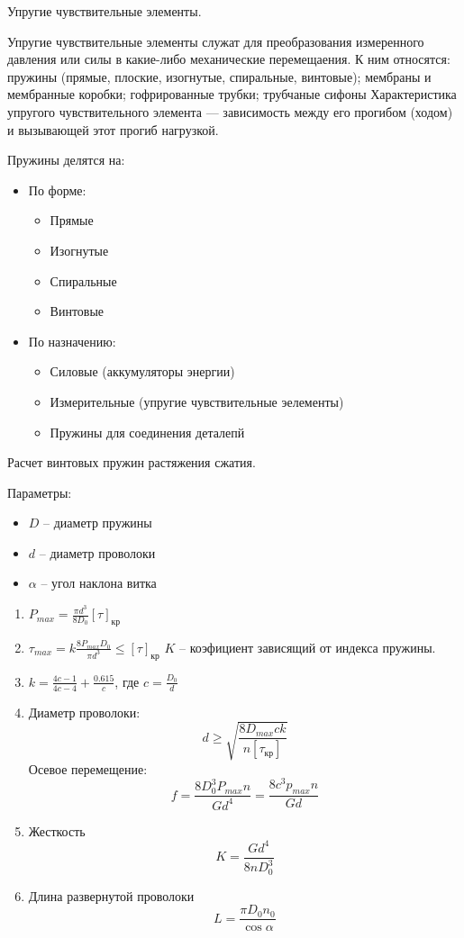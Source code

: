\documentclass{article}
\begin{document}
Упругие чувствительные элементы.

Упругие чувствительные элементы служат для преобразования измеренного давления или силы в какие-либо механические перемещаения. К ним относятся: пружины (прямые, плоские, изогнутые, спиральные, винтовые); мембраны и мембранные коробки; гофрированные трубки; трубчаные сифоны
Характеристика упругого чувствительного элемента --- зависимость между его прогибом (ходом) и вызывающей этот прогиб нагрузкой.

Пружины делятся на:
\begin{itemize}
	\item По форме:
	\begin{itemize}
		\item Прямые
		\item Изогнутые
		\item Спиральные
		\item Винтовые
	\end{itemize}
	\item По назначению:
	\begin{itemize}
		\item Силовые (аккумуляторы энергии)
		\item Измерительные (упругие чувствительные эелементы)
		\item Пружины для соединения деталепй
	\end{itemize}
\end{itemize}

Расчет винтовых пружин растяжения сжатия.

Параметры:
\begin{itemize}
	\item $D$ -- диаметр пружины
	\item $d$ -- диаметр проволоки
	\item $ \alpha$ -- угол наклона витка
\end{itemize}

\begin{enumerate}
	\item $P_{max} = \frac{ \pi d^3}{8 D_0} [\tau]_{кр}$
	\item $\tau_{max} = k \frac{8 P_{max} D_0}{\pi d^3} \le [\tau]_{кр} $ 
	$K$ -- коэфициент зависящий от индекса пружины.
	\item $k = \frac{4 c - 1}{4 c - 4} + \frac{0.615}{c} $, где $c = \frac{D_0}{d} $
	\item Диаметр проволоки:
	$$
	d \ge \sqrt { \frac{8 D_{max} c k}{n [\tau_{кр}]} }
	$$
	Осевое перемещение:
	$$
	f = \frac{8 D_0^3 P_{max} n}{G d^4} = \frac{8 c^3 p_{max} n}{G d} 
	$$
	\item Жесткость
	$$
	K = \frac{G d^4}{8 n D_0^3}
	$$
	\item Длина развернутой проволоки
	$$
	L = \frac{\pi D_0 n_0}{\cos{\alpha}} 
	$$
\end{enumerate}
\end{document}
